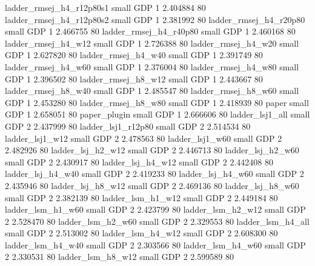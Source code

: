 ladder_rmsej_h4_r12p80s1      small      GDP                 1 2.404884 80
ladder_rmsej_h4_r12p80s2      small      GDP                 1 2.381992 80
  ladder_rmsej_h4_r20p80      small      GDP                 1 2.466755 80
  ladder_rmsej_h4_r40p80      small      GDP                 1 2.460168 80
     ladder_rmsej_h4_w12      small      GDP                 1 2.726388 80
     ladder_rmsej_h4_w20      small      GDP                 1 2.627820 80
     ladder_rmsej_h4_w40      small      GDP                 1 2.391749 80
     ladder_rmsej_h4_w60      small      GDP                 1 2.376004 80
     ladder_rmsej_h4_w80      small      GDP                 1 2.396502 80
     ladder_rmsej_h8_w12      small      GDP                 1 2.443667 80
     ladder_rmsej_h8_w40      small      GDP                 1 2.485547 80
     ladder_rmsej_h8_w60      small      GDP                 1 2.453280 80
     ladder_rmsej_h8_w80      small      GDP                 1 2.418939 80
                   paper      small      GDP                 1 2.658051 80
            paper_plugin      small      GDP                 1 2.666606 80
         ladder_lsj1_all      small      GDP                 2 2.437999 80
      ladder_lsj1_r12p80      small      GDP                 2 2.514534 80
         ladder_lsj1_w12      small      GDP                 2 2.478563 80
         ladder_lsj1_w60      small      GDP                 2 2.482926 80
       ladder_lsj_h2_w12      small      GDP                 2 2.446713 80
       ladder_lsj_h2_w60      small      GDP                 2 2.430917 80
       ladder_lsj_h4_w12      small      GDP                 2 2.442408 80
       ladder_lsj_h4_w40      small      GDP                 2 2.419233 80
       ladder_lsj_h4_w60      small      GDP                 2 2.435946 80
       ladder_lsj_h8_w12      small      GDP                 2 2.469136 80
       ladder_lsj_h8_w60      small      GDP                 2 2.382139 80
       ladder_lsm_h1_w12      small      GDP                 2 2.449184 80
       ladder_lsm_h1_w60      small      GDP                 2 2.423799 80
       ladder_lsm_h2_w12      small      GDP                 2 2.528470 80
       ladder_lsm_h2_w60      small      GDP                 2 2.329553 80
       ladder_lsm_h4_all      small      GDP                 2 2.513002 80
       ladder_lsm_h4_w12      small      GDP                 2 2.608300 80
       ladder_lsm_h4_w40      small      GDP                 2 2.303566 80
       ladder_lsm_h4_w60      small      GDP                 2 2.330531 80
       ladder_lsm_h8_w12      small      GDP                 2 2.599589 80
